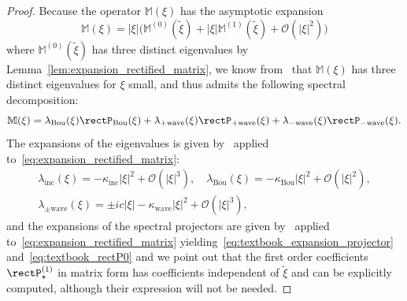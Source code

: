 \documentclass[10pt]{amsart}
\theoremstyle{definition}\newtheorem{defi}[theo]{Definition}\newtheorem{rema}[theo]{Remark}\newtheorem{exam}[theo]{Example}\newtheorem{exem}[theo]{Example}\newtheorem{nota}[theo]{Notation}
\newcommand{\Wave}{\mathrm{wave}}
\newcommand{\Inc}{\mathrm{inc}}
\newcommand{\Bou}{\mathrm{Bou}}
\newcommand{\rectsL}{\mathbb{M}}
\newcommand{\OO}{\mathcal{O}}
\begin{document}
\begin{proof}
Because the operator $\rectsL(\xi)$ has the asymptotic expansion
\[
\rectsL(\xi) = |\xi| \Big(\rectsL^{(0)}\left(\widetilde{\xi} \right) + | \xi | \rectsL^{(1)}\left(\widetilde{\xi} \right) + \OO\left(|\xi|^2 \right) \Big)
\]
where $\rectsL^{(0)}\left(\widetilde{\xi} \right)$ has three distinct eigenvalues by Lemma~\ref{lem:expansion_rectified_matrix}, we know from~\cite[Chapter~2, Theorem~5.4]{K1995} that $\rectsL(\xi)$ has three distinct eigenvalues for $\xi$ small, and thus admits the following spectral decomposition:
\[
\rectsL(\xi) = \lambda_\Bou(\xi) \rectP_\Bou(\xi) + \lambda_{+ \Wave}(\xi) \rectP_{+\Wave}(\xi) + \lambda_{- \Wave}(\xi) \rectP_{-\Wave}(\xi).
\]
The expansions of the eigenvalues is given by~\cite[Chapter~II-(5.12)]{K1995} applied to~\eqref{eq:expansion_rectified_matrix}:
\begin{gather*}
\lambda_\Inc(\xi) = - \kappa_\Inc | \xi |^2 + \OO\left(|\xi|^3 \right), \quad \lambda_\Bou(\xi) = - \kappa_\Bou | \xi |^2 + \OO\left(| \xi |^2 \right),\\
\lambda_{\pm \Wave}(\xi) = \pm i c | \xi| - \kappa_{\Wave} | \xi |^2 + \OO \left(| \xi |^3 \right),
\end{gather*}
and the expansions of the spectral projectors are given by~\cite[Chapter~II-(5.9)]{K1995} applied to~\eqref{eq:expansion_rectified_matrix} yielding~\eqref{eq:textbook_expansion_projector} and~\eqref{eq:textbook_rectP0} and we point out that the first order coefficients $\rectP^{(1)}_{\star}$ in matrix form has coefficients independent of $\widetilde{\xi}$ and can be explicitly computed, although their expression will not be needed.
\end{proof}
\end{document}
